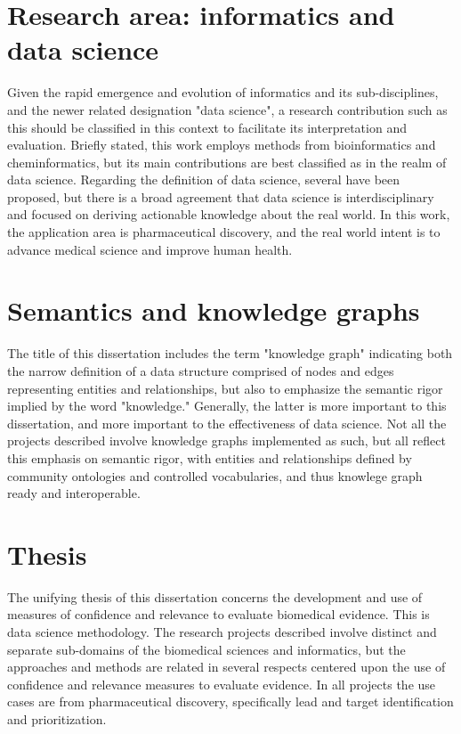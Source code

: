 \section{Research area: informatics and data science}

Given the rapid emergence and evolution of informatics and its sub-disciplines, and the newer related designation "data science", a research contribution such as this should be classified in this context to facilitate its interpretation and evaluation. Briefly stated, this work employs methods from bioinformatics and cheminformatics, but its main contributions are best classified as in the realm of data science. Regarding the definition of data science, several have been proposed\cite{ONeil2013-je,Peng2016-gq}, but there is a broad agreement that data science is interdisciplinary and focused on deriving actionable knowledge about the real world. In this work, the application area is pharmaceutical discovery, and the real world intent is to advance medical science and improve human health.

\section{Semantics and knowledge graphs}

The title of this dissertation includes the term "knowledge graph" indicating both the narrow definition of a data structure comprised of nodes and edges representing entities and relationships, but also to emphasize the semantic rigor implied by the word "knowledge." Generally, the latter is more important to this dissertation, and more important to the effectiveness of data science. Not all the projects described involve knowledge graphs implemented as such, but all reflect this emphasis on semantic rigor, with entities and relationships defined by community ontologies and controlled vocabularies, and thus
knowlege graph ready and interoperable.

\section{Thesis}

The unifying thesis of this dissertation concerns the development and use of measures of confidence and relevance to evaluate biomedical evidence. This is data science methodology. The research projects described involve distinct and separate sub-domains of the biomedical sciences and informatics, but the approaches and methods are related in several respects centered upon the use of confidence and relevance measures to evaluate evidence. In all projects the use cases are from pharmaceutical discovery, specifically lead and target identification and prioritization.  

